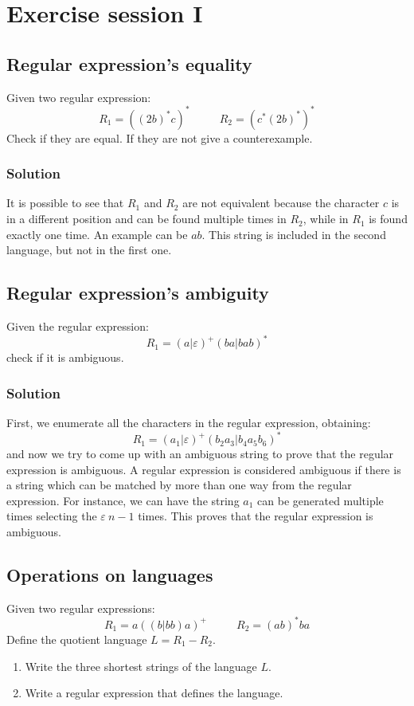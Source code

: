 \documentclass[12pt, a4paper]{report}
\newtheorem[style=M,bodystyle=\normalfont]{theorem}{Theorem}
\newtheorem[style=M,bodystyle=\normalfont]{corollary}{Corollary}
\newtheorem[style=M,bodystyle=\normalfont]{lemma}{Lemma}
\newtheorem[style=M,bodystyle=\normalfont]{definition}{Definition}
\begin{document}
\newpage

\tableofcontents

\newpage

\chapter{Exercise session I}

    \section{Regular expression's equality}
        Given two regular expression: 
        \[R_1=((2b)^{*}c)^* \:\:\:\:\:\:\:\:\:\:\:\: R_2=(c^*(2b)^{*})^*\]
        Check if they are equal. If they are not give a counterexample. 
    \subsection*{Solution}
        It is possible to see that $R_1$ and $R_2$ are not equivalent because the character $c$ is in a different position and can be found multiple times in $R_2$, while in $R_1$ is 
        found exactly one time. An example can be $ab$. This string is included in the second language, but not in the first one. 

    \newpage 

    \section{Regular expression's ambiguity}
        Given the regular expression: 
        \[R_1=(a|\varepsilon)^{+}(ba|bab)^{*}\]
        check if it is ambiguous. 
    \subsection*{Solution}
        First, we enumerate all the characters in the regular expression, obtaining: 
        \[R_1=(a_1|\varepsilon)^{+}(b_2a_3|b_4a_5b_6)^{*}\]
        and now we try to come up with an ambiguous string to prove that the regular expression is ambiguous. 
        A regular expression is considered ambiguous if there is a string which can be matched by more than one way from the regular expression. 
        For instance, we can have the string $a_1$ can be generated multiple times selecting the $\varepsilon \: n - 1$ times. This proves that the regular expression is ambiguous. 

    \newpage

    \section{Operations on languages}
        Given two regular expressions: 
        \[R_1=a((b|bb)a)^{+} \:\:\:\:\:\:\:\:\:\:\:\: R_2=(ab)^{*}ba\]
        Define the quotient language $L=R_1-R_2$. 
        \begin{enumerate}
            \item Write the three shortest strings of the language $L$.
            \item Write a regular expression that defines the language. 
        \end{enumerate}
\end{document}
